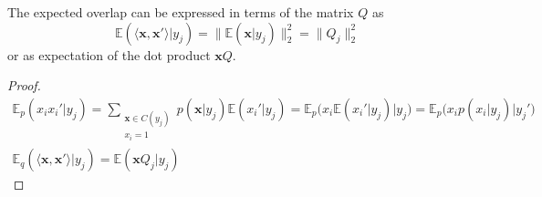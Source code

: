 \documentclass[oneside,english,logo]{amuthesis}
\begin{document}
\begin{theorem}
The expected overlap can be expressed in terms of the matrix $Q$ as 
\[
\mathbb{E}(\langle \boldsymbol{x}, \boldsymbol{x}'\rangle|y_j) = \lVert \mathbb{E}(\boldsymbol{x}|y_j) \rVert_2^2 =  \lVert Q_j \rVert_2^2
\]
or as expectation of the dot product $\boldsymbol{x}Q$.
\end{theorem}
\begin{proof}
\begin{gather*}
	\mathbb{E}_p(x_i x_i' | y_j) = 
	\sum_{\substack{\boldsymbol{x}\in C(y_j) \\ x_i=1}} p(\boldsymbol{x}|y_j) \mathbb{E}(x_i'|y_j)= \mathbb{E}_p\big(x_i \mathbb{E}(x_i'|y_j) \big| y_j\big) = \mathbb{E}_p\big(x_i p(x_i|y_j) \big| y_j'\big)\\
	\mathbb{E}_q(\langle \boldsymbol{x}, \boldsymbol{x}'\rangle|y_j) = \mathbb{E}(\boldsymbol{x} Q_j | y_j)
\end{gather*}
\end{proof}
\end{document}
